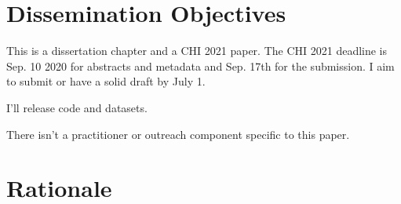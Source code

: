 \documentclass[12pt]{memoir}
\begin{document}
\section{Dissemination Objectives}

This is a dissertation chapter and a CHI 2021 paper. The CHI 2021 deadline is Sep. 10 2020 for abstracts and metadata and Sep. 17th for the submission. I aim to submit or have a solid draft by July 1.

I'll release code and datasets.

There isn't a practitioner or outreach component specific to this paper.

\section{Rationale}
\end{document}
